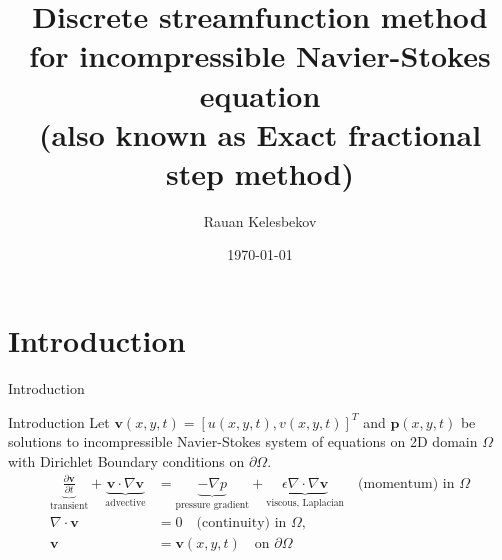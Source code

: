 \documentclass{beamer}
\title{Discrete streamfunction method for incompressible Navier-Stokes equation\\
(also known as Exact fractional step method)}
\date{\today}
\author{Rauan Kelesbekov}
\institute{University of Alberta}
\begin{document}
  \maketitle
  \section{Introduction}
  \begin{frame}{Introduction}
	\begin{figure}[H] %
	\end{figure}
	\end{frame}
  
  	\begin{frame}{Introduction}
  	Let $\boldsymbol{v}(x,y,t)=[u(x,y,t),v(x,y,t)]^T$ and $\boldsymbol{p}(x,y,t)$ be solutions to incompressible Navier-Stokes system of equations on 2D domain $\Omega$ with Dirichlet Boundary conditions on $\partial\Omega$.
	\begin{subequations}
	\label{eqs:NSE}
	\begin{align}
	\label{eqn:momentum-intro}
	\underbrace{\frac{\partial \boldsymbol{v}}{\partial t}}_{\text{transient}} 
		+ \underbrace{\boldsymbol{v} \cdot \nabla \boldsymbol{v}}_{\text{advective}} 
		&= \underbrace{-\nabla p}_{\text{pressure gradient}} 
		+ \underbrace{\epsilon \nabla \cdot \nabla \boldsymbol{v}}_{\text{viscous, Laplacian}}\quad\text{(momentum) in }\Omega\\
	\label{eqn:continuity}
	\nabla \cdot \boldsymbol{v} &= 0\quad\text{(continuity) in }\Omega,\\
	\boldsymbol{v}&=\boldsymbol{v}(x,y,t)\quad\text{on }\partial\Omega
	\end{align}
	\end{subequations}
  \end{frame}
  
\end{document}
